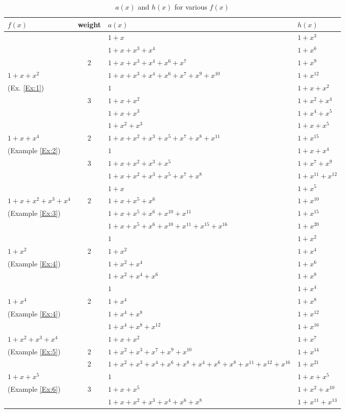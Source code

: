 \begin{table}[htbp]
\caption{$a(x)$ and $h(x)$ for various $f(x)$}
\centering
\begin{tabularx}{0.7\textwidth}{l|cXl} 
\toprule
$f(x)$ & weight & $a(x)$ & $h(x)$\\
\midrule
 &  & $1+x$ & $1+x^{3}$ \\
&  &$1+x+x^3+x^4$ & $1+x^{6}$  \\
& 2 &$1+x+x^3+x^4+x^6+x^{7}$ &  $1+x^{9}$ \\
$1+x+x^2$&& $1+x+x^3+x^4+x^6+x^{7}+x^9+x^{10}$&  $1+x^{12}$ \\
\cline{2-4}
(Ex. \ref{Ex:1})& &$1$ & $1+x+x^2$\\ 
& 3&$1+x+x^2$ &  $1+x^2+x^4$\\
& &$1+x+x^3$ & $1+x^4+x^5$\\
& &$1+x^2+x^3$ & $1+x+x^5$ \\
\cline{1-4}
$1+x+x^4$&2  & $1+x+x^2+x^3+x^5+x^7+x^8+x^{11}$ & $1+x^{15}$ \\
\cline{2-4}
(Example \ref{Ex:2})&&$1$&$1+x+x^4$  \\
&3&$1+x+x^2+x^3+x^5$&$1+x^7+x^9$  \\
&&$1+x+x^2+x^3+x^5+x^7+x^8$&$1+x^{11}+x^{12}$  \\
\cline{1-4}
&&$1+x$ &$1+x^5$\\ 
$1+x+x^2+x^3+x^4$&2&$1+x+x^5+x^6$ &$1+x^{10}$  \\
(Example \ref{Ex:3})&&$1+x+x^5+x^6+x^{10}+x^{11}$ & $1+x^{15}$ \\
&&$1+x+x^5+x^6+x^{10}+x^{11}+x^{15}+x^{16}$ &$1+x^{20}$  \\
\cline{1-4}
&&$1$ & $1+x^2$\\ 
$1+x^2$&2&$1+x^2$ & $1+x^4$ \\
(Example \ref{Ex:4})&&$1+x^2+x^4$ & $1+x^6$\\
&&$1+x^2+x^4+x^6$ & $1+x^8$\\
\cline{1-4}
&&$1$ & $1+x^4$\\ 
$1+x^4$&2&$1+x^4$ & $1+x^8$ \\
(Example \ref{Ex:4})&&$1+x^4+x^8$ & $1+x^{12}$\\
&&$1+x^4+x^8+x^{12}$ & $1+x^{16}$\\
\cline{1-4}
$1+x^2+x^3+x^4$&&$1+x+x^2$& $1+x^{7}$ \\
(Example \ref{Ex:5})&2&$1+x^2+x^3+x^7+x^9+x^{10}$	& $1+x^{14}$ \\
\cline{1-4}
&2&$1+x^2+x^3+x^4+x^6+x^8+x^{4}+x^{6}+x^{8}+x^{11}+x^{12}+x^{16}$ &  $1+x^{21}$\\
\cline{2-4}
$1+x+x^5$&&$1$ & $1+x+x^{5}$\\ 
(Example \ref{Ex:6})&3&$1+x+x^5$ &  $1+x^2+x^{10}$\\
&&$1+x+x^2+x^3+x^4+x^{6}+x^{8}$ & $1+x^{11}+x^{13}$\\
\bottomrule
\end{tabularx}
\label{examples-table}
\end{table}






